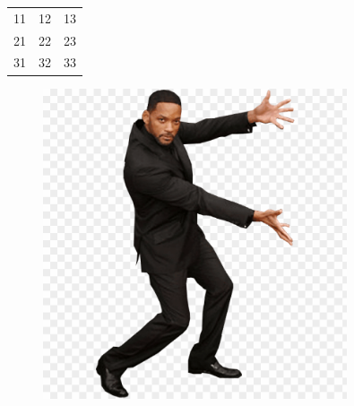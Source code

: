 \documentclass{article}
\begin{document}
\begin{center}
\begin{tabular}{ c c c }
11 & 12 & 13 \\
21 & 22 & 23 \\
31 & 32 & 33
\end{tabular}
\end{center}
\begin{figure}[ht]
\centering
\includegraphics[width=0.8\textwidth]{mem2.png}
\end{figure}
\end{document}
